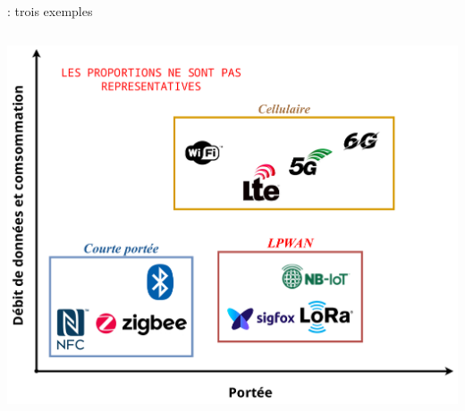 \documentclass[../main.tex]{subfiles}
\begin{document}
\begin{frame}{ : trois exemples}


  \begin{columns}
    \begin{column}{.5\linewidth} \centering
      \includegraphics[width=\linewidth, height=.65\textheight, keepaspectratio=true]{figures/drawiopdf/lpwan_and_co}
    \end{column}


\end{columns}
\end{frame}
\end{document}
